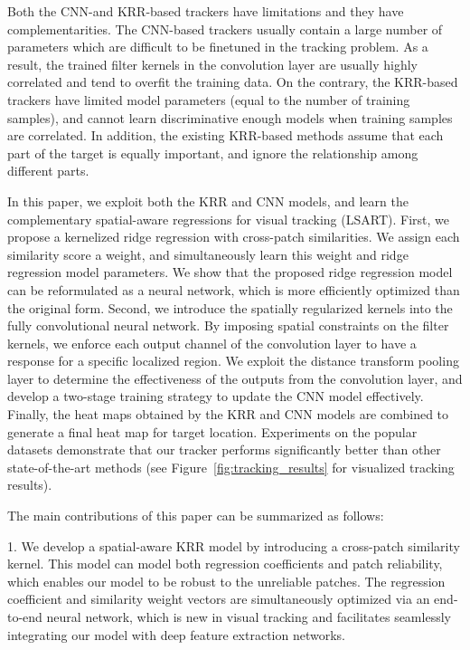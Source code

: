 \documentclass[10pt,twocolumn,letterpaper]{article}
\begin{document}
Both the CNN-and KRR-based trackers have limitations and they have complementarities.
The CNN-based trackers usually contain a large number of parameters which are difficult
to be finetuned in the tracking problem. As a result, the trained filter kernels in
the convolution layer are usually highly correlated and tend to overfit the training data.
On the contrary, the KRR-based trackers have limited model parameters (equal to the number
of training samples), and cannot learn discriminative enough models when training samples
are correlated. In addition, the existing KRR-based methods assume that each part of the
target is equally important, and ignore the relationship among different parts.




In this paper, we exploit both the KRR and CNN models,
and learn the complementary spatial-aware regressions for visual tracking (LSART).
First, we propose a kernelized ridge regression with cross-patch similarities.
We assign each similarity score a weight, and simultaneously learn this weight and
ridge regression model parameters.
We show that the proposed ridge regression model can be reformulated as a neural network,
which is more efficiently optimized than the original form.
Second, we introduce the spatially regularized kernels into the fully convolutional
neural network. By imposing spatial constraints on the filter kernels, we enforce each
output channel of the convolution layer to have a response for a specific localized region.
We exploit the distance transform pooling layer to determine the effectiveness of the
outputs from the convolution layer, and develop a two-stage training strategy to update
the CNN model effectively.
Finally, the heat maps obtained by the KRR and CNN models are combined to generate
a final heat map for target location.
Experiments on the popular datasets demonstrate that our tracker performs significantly
better than other state-of-the-art methods (see Figure~\ref{fig:tracking_results} for visualized tracking results).

The main contributions of this paper can be summarized as follows:

1. We develop a spatial-aware KRR model by introducing a cross-patch
similarity kernel. This model can model both regression coefficients
and patch reliability, which enables our model to be robust to the unreliable patches.
The regression coefficient and similarity weight vectors are simultaneously
optimized via an end-to-end neural network, which is new in visual tracking
and facilitates seamlessly integrating our model with deep feature extraction
networks.
\end{document}
